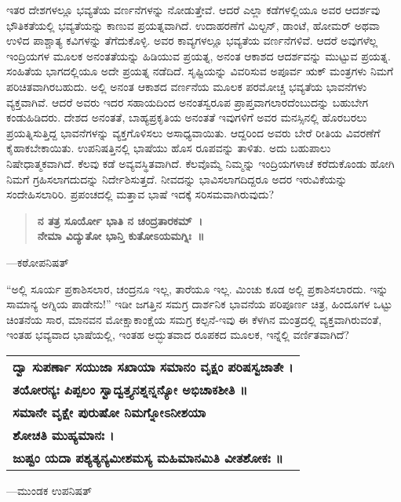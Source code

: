 ಇತರ ದೇಶಗಳಲ್ಲೂ ಭವ್ಯತೆಯ ವರ್ಣನೆಗಳನ್ನು ನೋಡುತ್ತೇವೆ. ಆದರೆ ಎಲ್ಲಾ ಕಡೆಗಳಲ್ಲಿಯೂ ಅವರ ಆದರ್ಶವು ಭೌತಿಕತೆಯಲ್ಲಿ ಭವ್ಯತೆಯನ್ನು ಕಾಣುವ ಪ್ರಯತ್ನವಾಗಿದೆ. ಉದಾಹರಣೆಗೆ ಮಿಲ್ಟನ್​, ಡಾಂಟೆ, ಹೋಮರ್​ ಅಥವಾ ಉಳಿದ ಪಾಶ್ಚಾತ್ಯ ಕವಿಗಳನ್ನು ತೆಗೆದುಕೊಳ್ಳಿ. ಅವರ ಕಾವ್ಯಗಳಲ್ಲೂ ಭವ್ಯತೆಯ ವರ್ಣನೆಗಳಿವೆ. ಆದರೆ ಅವುಗಳೆಲ್ಲ ಇಂದ್ರಿಯಗಳ ಮೂಲಕ ಅನಂತತೆಯನ್ನು ಹಿಡಿಯುವ ಪ್ರಯತ್ನ, ಅನಂತ ಆಕಾಶದ ಆದರ್ಶವನ್ನು ಮುಟ್ಟುವ ಪ್ರಯತ್ನ. ಸಂಹಿತೆಯ ಭಾಗದಲ್ಲಿಯೂ ಅದೇ ಪ್ರಯತ್ನ ನಡೆದಿದೆ. ಸೃಷ್ಟಿಯನ್ನು ವಿವರಿಸುವ ಅಪೂರ್ವ ಋಕ್​ ಮಂತ್ರಗಳು ನಿಮಗೆ ಪರಿಚಿತವಾಗಿರಬಹುದು. ಅಲ್ಲಿ ಅನಂತ ಆಕಾಶದ ವರ್ಣನೆಯ ಮೂಲಕ ಪರಮೋಚ್ಚ ಭವ್ಯತೆಯ ಭಾವನೆಗಳು ವ್ಯಕ್ತವಾಗಿವೆ. ಆದರೆ ಅವರು ಇದರ ಸಹಾಯದಿಂದ ಅನಂತಸ್ವರೂಪ ಪ್ರಾಪ್ತವಾಗಲಾರದೆಂಬುದನ್ನು ಬಹುಬೇಗ ಕಂಡುಹಿಡಿದರು. ದೇಶದ ಅನಂತತೆ, ಬಾಹ್ಯಪ್ರಕೃತಿಯ ಅನಂತತೆ ಇವುಗಳಿಗೆ ಅವರ ಮನಸ್ಸಿನಲ್ಲಿ ಹೊರಬರಲು ಪ್ರಯತ್ನಿಸುತ್ತಿದ್ದ ಭಾವನೆಗಳನ್ನು ವ್ಯಕ್ತಗೊಳಿಸಲು ಅಸಾಧ್ಯವಾಯಿತು. ಆದ್ದರಿಂದ ಅವರು ಬೇರೆ ರೀತಿಯ ವಿವರಣೆಗೆ ಕೈಹಾಕಬೇಕಾಯಿತು. ಉಪನಿಷತ್ತಿನಲ್ಲಿ ಭಾಷೆಯು ಹೊಸ ರೂಪವನ್ನು ತಾಳಿತು. ಅದು ಬಹುಪಾಲು ನಿಷೇಧಾತ್ಮಕವಾಗಿದೆ. ಕೆಲವು ಕಡೆ ಅವ್ಯವಸ್ಥಿತವಾಗಿದೆ. ಕೆಲವೊಮ್ಮೆ ನಿಮ್ಮನ್ನು ಇಂದ್ರಿಯಗಳಾಚೆ ಕರೆದುಕೊಂಡು ಹೋಗಿ ನಿಮಗೆ ಗ್ರಹಿಸಲಾಗದುದನ್ನು ನಿರ್ದೇಶಿಸುತ್ತದೆ. ನೀವದನ್ನು ಭಾವಿಸಲಾಗದಿದ್ದರೂ ಅದರ ಇರುವಿಕೆಯನ್ನು ಸಂದೇಹಿಸಲಾರಿರಿ. ಪ್ರಪಂಚದಲ್ಲಿ ಮತ್ತಾವ ಭಾಷೆ ಇದಕ್ಕೆ ಸರಿಸಮವಾಗಿರುವುದು?

\begin{verse}
\textbf{ನ ತತ್ರ ಸೂರ್ಯೋ ಭಾತಿ ನ ಚಂದ್ರತಾರಕಮ್​~।}\\\textbf{ನೇಮಾ ವಿದ್ಯುತೋ ಭಾನ್ತಿ ಕುತೋಽಯಮಗ್ನಿಃ~॥}
\end{verse}

\hfill —ಕಠೋಪನಿಷತ್​

“ಅಲ್ಲಿ ಸೂರ್ಯ ಪ್ರಕಾಶಿಸಲಾರ, ಚಂದ್ರನೂ ಇಲ್ಲ, ತಾರೆಯೂ ಇಲ್ಲ. ಮಿಂಚು ಕೂಡ ಅಲ್ಲಿ ಪ್ರಕಾಶಿಸಲಾರದು. ಇನ್ನು ಸಾಮಾನ್ಯ ಅಗ್ನಿಯ ಪಾಡೇನು!” ಇಡೀ ಜಗತ್ತಿನ ಸಮಗ್ರ ದಾರ್ಶನಿಕ ಭಾವನೆಯ ಪರಿಪೂರ್ಣ ಚಿತ್ರ, ಹಿಂದೂಗಳ ಒಟ್ಟು ಚಿಂತನೆಯ ಸಾರ, ಮಾನವನ ಮೋಕ್ಷಾಕಾಂಕ್ಷೆಯ ಸಮಗ್ರ ಕಲ್ಪನೆ-ಇವು ಈ ಕೆಳಗಿನ ಮಂತ್ರದಲ್ಲಿ ವ್ಯಕ್ತವಾಗಿರುವಂತೆ, ಇಂತಹ ಭವ್ಯವಾದ ಭಾಷೆಯಲ್ಲಿ, ಇಂತಹ ಅದ್ಭುತವಾದ ರೂಪಕದ ಮೂಲಕ, ಇನ್ನೆಲ್ಲಿ ವರ್ಣಿತವಾಗಿದೆ?

\begin{longtable}{@{\hspace{-18pt}}l@{}}
\textbf{ದ್ವಾ ಸುಪರ್ಣಾ ಸಯುಜಾ ಸಖಾಯಾ ಸಮಾನಂ ವೃಕ್ಷಂ ಪರಿಷಸ್ವಜಾತೇ ।} \\
\textbf{ತಯೋರನ್ಯಃ ಪಿಪ್ಪಲಂ ಸ್ವಾದ್ವತ್ತ್ಯನಶ್ನನ್ನನ್ಯೋ ಅಭಿಚಾಕಶೀತಿ ॥} \\
\textbf{ಸಮಾನೇ ವೃಕ್ಷೇ ಪುರುಷೋ ನಿಮಗ್ನೋಽನೀಶಯಾ} \\
\textbf{ಶೋಚತಿ ಮುಹ್ಯಮಾನಃ ।} \\
\textbf{ಜುಷ್ಟಂ ಯದಾ ಪಶ್ಯತ್ಯನ್ಯಮೀಶಮಸ್ಯ ಮಹಿಮಾನಮಿತಿ ವೀತಶೋಕಃ ॥} \\
\end{longtable}

\hfill —ಮುಂಡಕ ಉಪನಿಷತ್​

